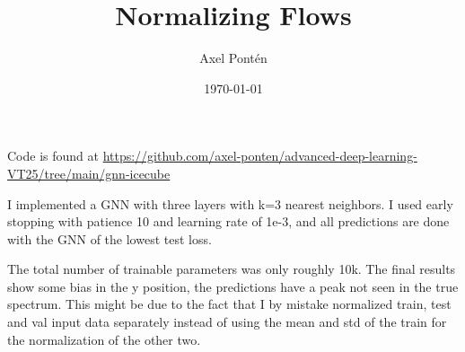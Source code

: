 \documentclass[12pt, a4paper]{article}
\title{Normalizing Flows}
\author{Axel Pontén}
\date{\today}
\begin{document}
\maketitle

Code is found at \url{https://github.com/axel-ponten/advanced-deep-learning-VT25/tree/main/gnn-icecube}

I implemented a GNN with three layers with k=3 nearest neighbors. I used early stopping with patience 10 and learning rate of 1e-3, and all predictions are done with the GNN of the lowest test loss.

The total number of trainable parameters was only roughly 10k. The final results show some bias in the y position, the predictions have a peak not seen in the true spectrum. This might be due to the fact that I by mistake normalized train, test and val input data separately instead of using the mean and std of the train for the normalization of the other two.
\end{document}
